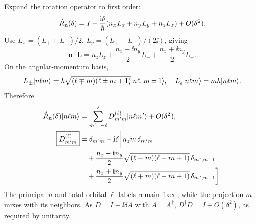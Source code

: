 Expand the rotation operator to first order:
\[
\hat R_{\mathbf n}(\delta)=
I-\frac{\mathrm i\delta}{\hbar}
(n_xL_x+n_yL_y+n_zL_z)+O(\delta^2).
\]
Use $L_x=(L_++L_-)/2$,
$L_y=(L_+-L_-)/(2\ii)$, giving
\[
\mathbf n\cdot\mathbf L=
n_zL_z+\frac{n_x-\ii n_y}{2}L_+
+\frac{n_x+\ii n_y}{2}L_-.
\]
On the angular-momentum basis,
\[
L_\pm\lvert n\ell m\rangle=
\hbar\sqrt{(\ell\mp m)(\ell\pm m+1)}
\lvert n\ell,m\pm1\rangle,
\quad L_z\lvert n\ell m\rangle=m\hbar\lvert n\ell m\rangle.
\]
Therefore
\begin{align}
\hat R_{\mathbf n}(\delta)\lvert n\ell m\rangle
&=\sum_{m'=-\ell}^{\ell}
D_{m'm}^{(\ell)}\lvert n\ell m'\rangle+O(\delta^2),\\
\boxed{D_{m'm}^{(\ell)}}&=
\delta_{m'm}-\mathrm i\delta\bigg[
n_zm\,\delta_{m'm}\\
&\quad+\frac{n_x-\mathrm i n_y}{2}
\sqrt{(\ell-m)(\ell+m+1)}\,
\delta_{m',m+1}\\
&\quad+\frac{n_x+\mathrm i n_y}{2}
\sqrt{(\ell+m)(\ell-m+1)}\,
\delta_{m',m-1}
\bigg].
\end{align}
The principal $n$ and total orbital
$\ell$ labels remain fixed, while
the projection $m$ mixes with its
neighbors. As $D=I-\ii\delta A$
with $A=A^\dagger$, $D^\dagger D
=I+O(\delta^2)$, as required
by unitarity.

